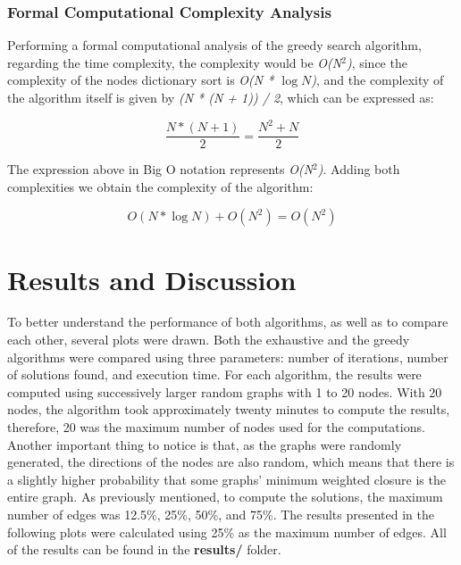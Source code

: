 \documentclass[...]{revdetua}
\begin{document}
\subsubsection{Formal Computational Complexity Analysis}





Performing a formal computational analysis of the greedy search algorithm, regarding the time complexity, the complexity would be \textit{O(N$^2$)}, since the complexity of the nodes dictionary sort is \textit{O(N * $\log N$)}, and the complexity of the algorithm itself is given by \textit{(N * (N + 1)) / 2}, which can be expressed as:

\[
    \frac{N * (N + 1)}{2} = \frac{N^2 + N}{2}
\]

The expression above in Big O notation represents \textit{O(N$^2$)}. Adding both complexities we obtain the complexity of the algorithm:

\[
    O(N * \log N) + O(N^2) = O(N^2)
\]

\newpage

\section{Results and Discussion}

To better understand the performance of both algorithms, as well as to compare each other, several plots were drawn. Both the exhaustive and the greedy algorithms were compared using three parameters: number of iterations, number of solutions found, and execution time. 
For each algorithm, the results were computed using successively larger random graphs with 1 to 20 nodes. With 20 nodes, the algorithm took approximately twenty minutes to compute the results, therefore, 20 was the maximum number of nodes used for the computations. Another important thing to notice is that, as the graphs were randomly generated, the directions of the nodes are also random, which means that there is a slightly higher probability that some graphs' minimum weighted closure is the entire graph. As previously mentioned, to compute the solutions, the maximum number of edges was 12.5\%, 25\%, 50\%, and 75\%. The results presented in the following plots were calculated using 25\% as the maximum number of edges. All of the results can be found in the \textbf{results/} folder.
\end{document}
